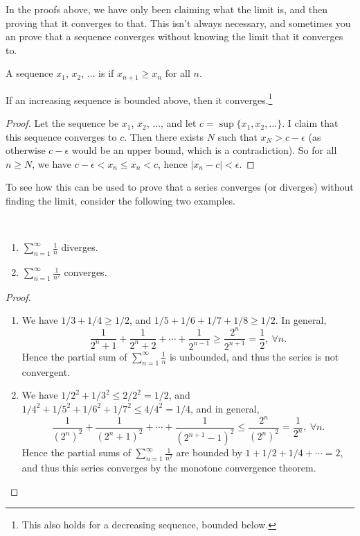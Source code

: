 \documentclass[a4paper]{scrreprt}
\begin{document}
In the proofs above, we have only been claiming what the limit is, and then proving that it converges to that. This isn't always necessary, and sometimes you an prove that a sequence converges without knowing the limit that it converges to.

\begin{definition}
	A sequence $x_1$, $x_2$, $\dots$ is  if $x_{n + 1} \geq x_n$ for all $n$.
\end{definition}

\begin{theorem}
	If an increasing sequence is bounded above, then it converges.\footnote{
		This also holds for a decreasing sequence, bounded below.}
\end{theorem}
\begin{proof}
	Let the sequence be $x_1$, $x_2$, $\dots$, and let $c = \sup \{x_1, x_2, \dots\}$. I claim that this sequence converges to $c$. Then there exists $N$ such that $x_N > c - \epsilon$ (as otherwise $c - \epsilon$ would be an upper bound, which is a contradiction). So for all $n \geq N$, we have $c - \epsilon < x_n \leq x_n < c$, hence $|x_n - c| < \epsilon$.
\end{proof}

To see how this can be used to prove that a series converges (or diverges) without finding the limit, consider the following two examples.
\begin{proposition}~
	    \vspace*{-1.5\baselineskip}
	\begin{enumerate}[label=(\roman*)]
	    \item $\displaystyle \sum_{n = 1}^{\infty} \frac{1}{n}$ diverges.
	    \item $\displaystyle \sum_{n = 1}^{\infty} \frac{1}{n^2}$ converges.
	\end{enumerate}
\end{proposition}
\begin{proof}$ $
\begin{enumerate}[label=(\roman*)]
	\item We have $1/3 + 1/4 \geq 1/2$, and $1/5 + 1/6 + 1/7 + 1/8 \geq 1/2$. In general,
	$$
	\frac{1}{2^n + 1} + \frac{1}{2^n + 2} + \cdots + \frac{1}{2^{n - 1}} \geq \frac{2^n}{2^{n + 1}} = \frac{1}{2},\  \forall n.
	$$
	Hence the partial sum of $\sum_{n = 1}^{\infty} \frac{1}{n}$ is unbounded, and thus the series is not convergent.
	\item We have $1/2^2 + 1/3^2 \leq 2/2^2 = 1/2$, and $1/4^2 + 1/5^2 + 1/6^2 + 1/7^2 \leq 4/4^2 = 1/4$, and in general,
	$$
	\frac{1}{(2^n)^2} + \frac{1}{(2^n + 1)^2} + \cdots + \frac{1}{(2^{n + 1} - 1)^2} \leq \frac{2^n}{(2^n)^2} = \frac{1}{2^n}, \ \forall n.
	$$
	Hence the partial sums of $\sum_{n = 1}^\infty \frac{1}{n^2}$ are bounded by $1 + 1/2 + 1/4 + \cdots = 2$, and thus this series converges by the monotone convergence theorem.
\end{enumerate}
\end{proof}
\end{document}
